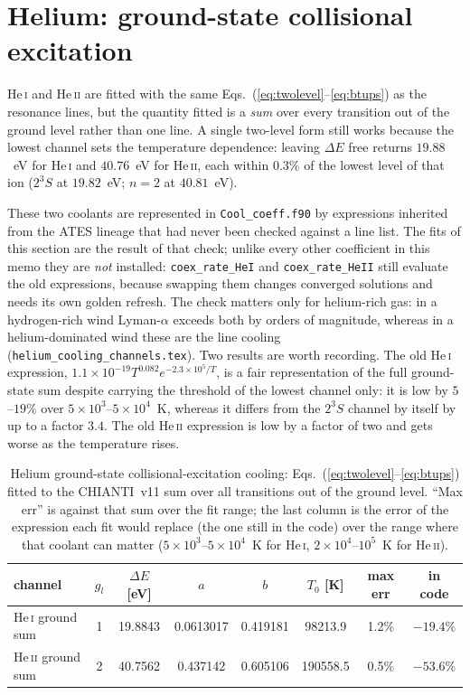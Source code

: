 \documentclass[english,a4paper]{my_memo}
\begin{document}
\section{Helium: ground-state collisional excitation}
\label{sec:helium}

He\,\textsc{i} and He\,\textsc{ii} are fitted with the same
Eqs.~(\ref{eq:twolevel}--\ref{eq:btups}) as the resonance lines, but the
quantity fitted is a \emph{sum} over every transition out of the ground
level rather than one line.  A single two-level form still works because
the lowest channel sets the temperature dependence: leaving $\Delta E$
free returns $19.88$~eV for He\,\textsc{i} and $40.76$~eV for
He\,\textsc{ii}, each within $0.3\%$ of the lowest level of that ion
($2^3S$ at $19.82$~eV; $n=2$ at $40.81$~eV).

These two coolants are represented in \texttt{Cool\_coeff.f90} by expressions
inherited from the ATES lineage that had never been checked against a line list.
The fits of this section are the result of that check; unlike every other
coefficient in this memo they are \emph{not} installed: \texttt{coex\_rate\_HeI}
and \texttt{coex\_rate\_HeII} still evaluate the old expressions, because
swapping them changes converged solutions and needs its own golden refresh.
The check matters only for helium-rich gas: in a hydrogen-rich wind
Lyman-$\alpha$ exceeds both by orders of magnitude, whereas in a
helium-dominated wind these are the line cooling
(\texttt{helium\_cooling\_channels.tex}).  Two results are worth
recording.  The old He\,\textsc{i} expression,
$1.1\times10^{-19}T^{0.082}e^{-2.3\times10^5/T}$, is a fair
representation of the full ground-state sum despite carrying the
threshold of the lowest channel only: it is low by $5$--$19\%$ over
$5\times10^3$--$5\times10^4$~K, whereas it differs from the $2^3S$
channel by itself by up to a factor $3.4$.  The old He\,\textsc{ii}
expression is low by a factor of two and gets worse as the temperature
rises.

\begin{table}[htbp]
\centering\small
\caption{Helium ground-state collisional-excitation cooling:
Eqs.~(\ref{eq:twolevel}--\ref{eq:btups}) fitted to the CHIANTI~v11 sum
over all transitions out of the ground level.  ``Max err'' is against
that sum over the fit range; the last column is the error of the
expression each fit would replace (the one still in the code) over the
range where that coolant can matter ($5\times10^3$--$5\times10^4$~K for He\,\textsc{i},
$2\times10^4$--$10^5$~K for He\,\textsc{ii}).}
\label{tab:helium}
\begin{tabular}{lccccccc}
\toprule
channel & $g_l$ & $\Delta E$ [eV] & $a$ & $b$ & $T_0$ [K]
        & max err & in code \\
\midrule
He\,\textsc{i} ground sum  & 1 & 19.8843 & 0.0613017 & 0.419181
  & 98213.9 & 1.2\% & $-19.4\%$ \\
He\,\textsc{ii} ground sum & 2 & 40.7562 & 0.437142  & 0.605106
  & 190558.5 & 0.5\% & $-53.6\%$ \\
\bottomrule
\end{tabular}
\end{table}
\end{document}
